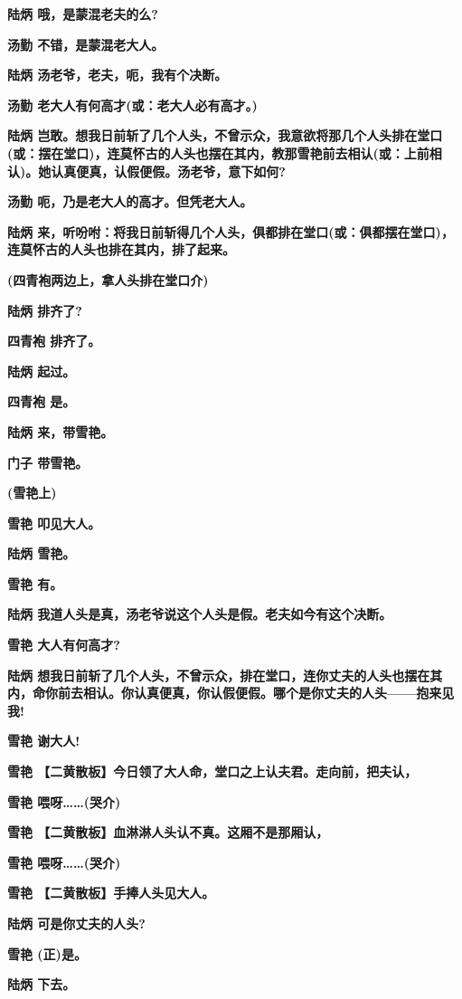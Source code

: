 \textbf{陆炳 哦，是蒙混老夫的么?}

\textbf{汤勤 不错，是蒙混老大人。}

\textbf{陆炳 汤老爷，老夫，呃，我有个决断。}

\textbf{汤勤 老大人有何高才(或：老大人必有高才。)}

\textbf{陆炳
岂敢。想我日前斩了几个人头，不曾示众，我意欲将那几个人头排在堂口(或：摆在堂口)，连莫怀古的人头也摆在其内，教那雪艳前去相认(或：上前相认)。她认真便真，认假便假。汤老爷，意下如何?}

\textbf{汤勤 呃，乃是老大人的高才。但凭老大人。}

\textbf{陆炳
来，听吩咐：将我日前斩得几个人头，俱都排在堂口(或：俱都摆在堂口)，连莫怀古的人头也排在其内，排了起来。}

\textbf{(四青袍两边上，拿人头排在堂口介)}

\textbf{陆炳 排齐了?}

\textbf{四青袍 排齐了。}

\textbf{陆炳 起过。}

\textbf{四青袍 是。}

\textbf{陆炳 来，带雪艳。}

\textbf{门子 带雪艳。}

\textbf{(雪艳上)}

\textbf{雪艳 叩见大人。}

\textbf{陆炳 雪艳。}

\textbf{雪艳 有。}

\textbf{陆炳 我道人头是真，汤老爷说这个人头是假。老夫如今有这个决断。}

\textbf{雪艳 大人有何高才?}

\textbf{陆炳
想我日前斩了几个人头，不曾示众，排在堂口，连你丈夫的人头也摆在其内，命你前去相认。你认真便真，你认假便假。哪个是你丈夫的人头------抱来见我!}

\textbf{雪艳 谢大人!}

\textbf{雪艳
【二黄散板】今日领了大人命，堂口之上认夫君。走向前，把夫认，}

\textbf{雪艳 喂呀\ldots{}\ldots{}(哭介)}

\textbf{雪艳 【二黄散板】血淋淋人头认不真。这厢不是那厢认，}

\textbf{雪艳 喂呀\ldots{}\ldots{}(哭介)}

\textbf{雪艳 【二黄散板】手捧人头见大人。}

\textbf{陆炳 可是你丈夫的人头?}

\textbf{雪艳 (正)是。}

\textbf{陆炳 下去。}

